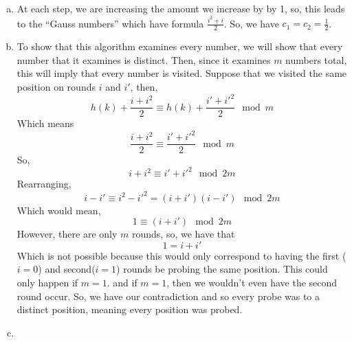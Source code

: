 \documentclass{article}
\begin{document}
\begin{enumerate}[a.]
\item
At each step, we are increasing the amount we increase by by 1, so, this leads to the ``Gauss numbers'' which have formula $\frac{i^2+i}{2}$. So, we have $c_1 = c_2 = \frac{1}{2}$.

\item

To show that this algorithm examines every number, we will show that every number that it examines is distinct. Then, since it examines $m$ numbers total, this will imply that every number is visited. Suppose that we visited the same position on rounds $i$ and $i'$, then,
\[
h(k) + \frac{i+i^2}{2} \equiv h(k) + \frac{i'+i'^2}{2} \mod m
\]
Which means
\[
 \frac{i+i^2}{2} \equiv\frac{i'+i'^2}{2} \mod m
\]
So,
\[
 i+i^2 \equiv i'+i'^2 \mod 2m
\]
Rearranging,
\[
 i - i' \equiv i^2 - i'^2 = (i+i')(i-i') \mod 2m
\]
Which would mean,
\[
1 \equiv(i+i') \mod 2m
\]
However, there are only $m$ rounds, so, we have that
\[
1 = i+i'
\]
Which is not possible because this would only correspond to having the first ($i=0$) and second($i=1$) rounds be probing the same position. This could only happen if $m=1$. and if $m=1$, then we wouldn't even have the second round occur. So, we have our contradiction and so every probe was to a distinct position, meaning every position was probed.
\item
\end{enumerate}
\end{document}
